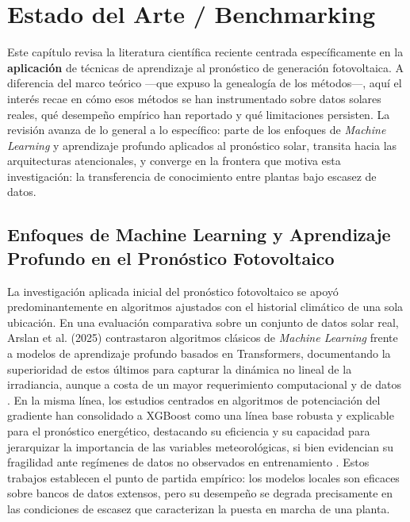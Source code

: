 \section{Estado del Arte / Benchmarking}
Este capítulo revisa la literatura científica reciente centrada específicamente en la \textbf{aplicación} de técnicas de aprendizaje al pronóstico de generación fotovoltaica. A diferencia del marco teórico —que expuso la genealogía de los métodos—, aquí el interés recae en cómo esos métodos se han instrumentado sobre datos solares reales, qué desempeño empírico han reportado y qué limitaciones persisten. La revisión avanza de lo general a lo específico: parte de los enfoques de \textit{Machine Learning} y aprendizaje profundo aplicados al pronóstico solar, transita hacia las arquitecturas atencionales, y converge en la frontera que motiva esta investigación: la transferencia de conocimiento entre plantas bajo escasez de datos.

\subsection{Enfoques de Machine Learning y Aprendizaje Profundo en el Pronóstico Fotovoltaico}
La investigación aplicada inicial del pronóstico fotovoltaico se apoyó predominantemente en algoritmos ajustados con el historial climático de una sola ubicación. En una evaluación comparativa sobre un conjunto de datos solar real, Arslan et al. (2025) contrastaron algoritmos clásicos de \textit{Machine Learning} frente a modelos de aprendizaje profundo basados en Transformers, documentando la superioridad de estos últimos para capturar la dinámica no lineal de la irradiancia, aunque a costa de un mayor requerimiento computacional y de datos \cite{Arslan2025}. En la misma línea, los estudios centrados en algoritmos de potenciación del gradiente han consolidado a XGBoost como una línea base robusta y explicable para el pronóstico energético, destacando su eficiencia y su capacidad para jerarquizar la importancia de las variables meteorológicas, si bien evidencian su fragilidad ante regímenes de datos no observados en entrenamiento \cite{rodriguez2023energy}. Estos trabajos establecen el punto de partida empírico: los modelos locales son eficaces sobre bancos de datos extensos, pero su desempeño se degrada precisamente en las condiciones de escasez que caracterizan la puesta en marcha de una planta.

